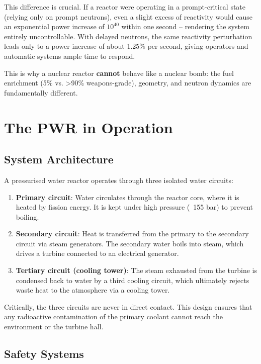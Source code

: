This difference is crucial. If a reactor were operating in a prompt-critical state (relying only on prompt neutrons), even a slight excess of reactivity would cause an exponential power increase of $10^{40}$ within one second -- rendering the system entirely uncontrollable. With delayed neutrons, the same reactivity perturbation leads only to a power increase of about 1.25\% per second, giving operators and automatic systems ample time to respond.

This is why a nuclear reactor \textbf{cannot} behave like a nuclear bomb: the fuel enrichment (5\% vs. >90\% weapons-grade), geometry, and neutron dynamics are fundamentally different.

\section{The PWR in Operation}

\subsection{System Architecture}

A pressurised water reactor operates through three isolated water circuits:

\begin{enumerate}[noitemsep]
    \item \textbf{Primary circuit}: Water circulates through the reactor core, where it is heated by fission energy. It is kept under high pressure (~155 bar) to prevent boiling.
    \item \textbf{Secondary circuit}: Heat is transferred from the primary to the secondary circuit via steam generators. The secondary water boils into steam, which drives a turbine connected to an electrical generator.
    \item \textbf{Tertiary circuit (cooling tower)}: The steam exhausted from the turbine is condensed back to water by a third cooling circuit, which ultimately rejects waste heat to the atmosphere via a cooling tower.
\end{enumerate}

Critically, the three circuits are never in direct contact. This design ensures that any radioactive contamination of the primary coolant cannot reach the environment or the turbine hall.

\subsection{Safety Systems}

